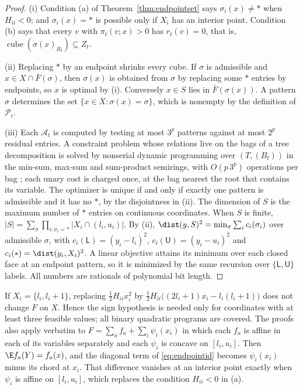 \begin{proof}
(i) Condition (a) of Theorem~\ref{thm:endpointset} says $\sigma_i(x)\ne\ast$
when $H_{ii}<0$; and $\sigma_i(x)=\ast$ is possible only if $X_i$ has an
interior point. Condition (b) says that every $v$ with $\pi_t(v;x)>0$ has
$r_t(v)=0$, that is, $\operatorname{cube}(\sigma(x)_{B_t})\subseteq Z_t$.

(ii) Replacing $\ast$ by an endpoint shrinks every cube. If $\sigma$ is
admissible and $x\in X\cap\bar F(\sigma)$, then $\sigma(x)$ is obtained from
$\sigma$ by replacing some $\ast$ entries by endpoints, so $x$ is optimal by
(i). Conversely $x\in S$ lies in $\bar F(\sigma(x))$. A pattern $\sigma$
determines the set $\{x\in X:\sigma(x)=\sigma\}$, which is nonempty by the
definition of $\mathcal P_i$.

(iii) Each $\mathcal A_t$ is computed by testing at most $3^p$ patterns
against at most $2^p$ residual entries. A constraint problem whose relations
live on the bags of a tree decomposition is solved by nonserial dynamic
programming over $(T,(B_t))$ in the min-sum, max-sum and sum-product
semirings, with $O(p\,3^p)$ operations per bag \cite{Dechter1999}; each unary
cost is charged once, at the bag nearest the root that contains its variable.
The optimizer is unique if and only if exactly one pattern is admissible and
it has no $\ast$, by the disjointness in (ii). The dimension of $S$ is the
maximum number of $\ast$ entries on continuous coordinates. When $S$ is finite,
$|S|=\sum_\sigma\prod_{i:\sigma_i=\ast}|X_i\cap(l_i,u_i)|$. By (ii),
$\dist(y,S)^2=\min_\sigma\sum_ic_i(\sigma_i)$ over admissible $\sigma$, with
$c_i(\mathsf L)=(y_i-l_i)^2$, $c_i(\mathsf U)=(y_i-u_i)^2$ and
$c_i(\ast)=\dist(y_i,X_i)^2$. A linear objective attains its minimum over each
closed face at an endpoint pattern, so it is minimized by the same
recursion over $\{\mathsf L,\mathsf U\}$ labels. All numbers are rationals of
polynomial bit length.
\end{proof}

\begin{remark}\label{rem:endpointext}
If $X_i=\{l_i,l_i+1\}$, replacing $\frac12H_{ii}x_i^2$ by
$\frac12H_{ii}\bigl((2l_i+1)x_i-l_i(l_i+1)\bigr)$ does not change $F$ on $X$.
Hence the sign hypothesis is needed only for coordinates with at least three
feasible values; all binary quadratic programs are covered. The proofs also
apply verbatim to $F=\sum_af_a+\sum_i\psi_i(x_i)$ in which each $f_a$ is
affine in each of its variables separately and each $\psi_i$ is concave on
$[l_i,u_i]$. Then $\E f_a(Y)=f_a(x)$, and the diagonal term of
\eqref{eq:endpointid} becomes $\psi_i(x_i)$ minus its chord at $x_i$. That
difference vanishes at an interior point exactly when $\psi_i$ is affine on
$[l_i,u_i]$, which replaces the condition $H_{ii}<0$ in (a).
\end{remark}

